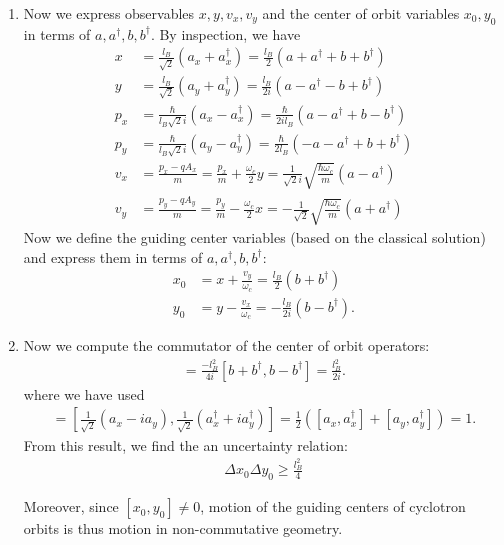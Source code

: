 \documentclass{article}
\theoremstyle{definition}
\newcommand{\f}[2]{\frac{#1}{#2}}
\newcommand{\lp}{\left(}
\newcommand{\rp}{\right)}
\newcommand{\lb}{\left[}
\newcommand{\rb}{\right]}
\begin{document}
\begin{enumerate}[label=\alph*)]
	\item Now we express observables $x,y,v_x,v_y$ and the center of orbit variables $x_0,y_0$ in terms of $a,a^\dagger,b,b^\dagger$. By inspection, we have
	\begin{align*}
	x &= \f{l_B}{\sqrt{2}}(a_x + a_x^\dagger) = \f{l_B}{2}(a+a^\dagger + b + b^\dagger) \\
	y &= \f{l_B}{\sqrt{2}}(a_y + a_y^\dagger) = \f{l_B}{2i}(a-a^\dagger - b + b^\dagger) \\
	p_x &= \f{\hbar}{l_B\sqrt{2}i} (a_x - a_x^\dagger) = \f{\hbar}{2i l_B } (a-a^\dagger + b - b^\dagger)\\
	p_y &= \f{\hbar}{l_B\sqrt{2}i} (a_y - a_y^\dagger) = \f{\hbar}{2l_B } (-a -a^\dagger + b + b^\dagger) \\
	v_x &= \f{p_x - qA_x}{m} = \f{p_x}{m} + \f{\omega_c}{2}y = \f{1}{\sqrt{2} i} \sqrt{\f{\hbar \omega_c}{m}} (a - a^\dagger) \\
	v_y &= \f{p_y - qA_y}{m} = \f{p_y}{m} - \f{\omega_c}{2}x = -\f{1}{\sqrt{2}} \sqrt{\f{\hbar \omega_c}{m}} ( a + a^\dagger)
	\end{align*}
	Now we define the guiding center variables (based on the classical solution) and express them in terms of $a,a^\dagger,b,b^\dagger$:
	\begin{align*}
	x_0 &= x + \f{v_y}{\omega_c} = \f{l_B}{2}(b+b^\dagger)\\
	y_0 &= y - \f{v_x}{\omega_c} = -\f{l_B}{2i}(b-b^\dagger).
	\end{align*}
	
	
	\item Now we compute the commutator of the center of orbit operators:
	\begin{align*}
	[x_0, y_0] = \f{-l_B^2}{4i}[b+b^\dagger, b -b^\dagger] = \f{l_B^2}{2i}.
	\end{align*}
	where we have used 
	\begin{align*}
		[b,b^\dagger] = \lb \f{1}{\sqrt{2}}(a_x - ia_y), \f{1}{\sqrt{2}} (a_x^\dagger + ia_y^\dagger) \rb  = \f{1}{2}\lp [a_x,a_x^\dagger] + [a_y,  a_y^\dagger] \rp = 1.
	\end{align*}
	From this result, we find the an uncertainty relation:
	\begin{align*}
		\Delta x_0 \Delta y_0 \geq \f{l_B^2}{4}
	\end{align*}


	Moreover, since $[x_0,y_0] \neq 0$, motion of the guiding centers of cyclotron orbits is thus motion in non-commutative geometry.\\
	

\end{enumerate}
\end{document}
